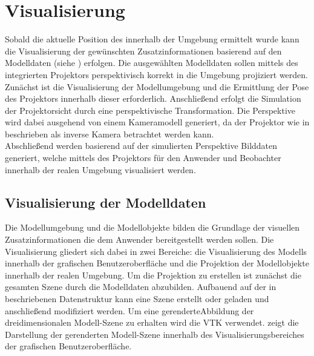 \chapter{Visualisierung}
\label{chap.vis}

Sobald die aktuelle Position des  innerhalb der Umgebung ermittelt wurde kann die Visualisierung der gewünschten Zusatzinformationen basierend auf den Modelldaten (siehe ) erfolgen. Die ausgewählten Modelldaten sollen mittels des integrierten Projektors perspektivisch korrekt in die Umgebung projiziert werden.\\
Zunächst ist die Visualisierung der Modellumgebung und die Ermittlung der Pose des Projektors innerhalb dieser erforderlich. Anschließend erfolgt die Simulation der Projektorsicht durch eine perspektivische Transformation. Die Perspektive wird dabei ausgehend von einem Kameramodell generiert, da der Projektor wie in  beschrieben als inverse Kamera betrachtet werden kann.\\
Abschließend werden basierend auf der simulierten Perspektive Bilddaten generiert, welche mittels des Projektors für den Anwender und Beobachter innerhalb der realen Umgebung visualisiert werden.

\section{Visualisierung der Modelldaten}
Die Modellumgebung und die Modellobjekte bilden die Grundlage der visuellen Zusatzinformationen die dem Anwender bereitgestellt werden sollen. Die Visualisierung gliedert sich dabei in zwei Bereiche: die Visualisierung des Modells innerhalb der grafischen Benutzeroberfläche und die Projektion der Modellobjekte innerhalb der realen Umgebung.
Um die Projektion zu erstellen ist zunächst die gesamten Szene durch die Modelldaten abzubilden. Aufbauend auf der in  beschriebenen Datenstruktur kann eine Szene erstellt oder geladen und anschließend modifiziert werden. Um eine gerenderte\red[footnote?] Abbildung der dreidimensionalen Modell-Szene zu erhalten wird die \red[Visualisierungsbibliothek] VTK verwendet.  zeigt die Darstellung der gerenderten Modell-Szene innerhalb des Visualisierungsbereiches der grafischen Benutzeroberfläche.\\

